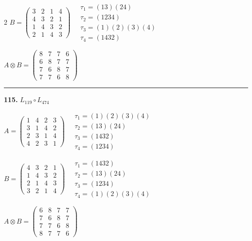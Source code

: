 \begin{multicols}{2}
$B = \begin{pmatrix} 3 & 2 & 1 & 4 \\ 4 & 3 & 2 & 1 \\ 1 & 4 & 3 & 2 \\ 2 & 1 & 4 & 3 \end{pmatrix} \quad \begin{matrix} \tau_{1}=(1 3)(2 4) \\ \tau_{2}=(1 2 3 4) \\ \tau_{3}=(1)(2)(3)(4) \\ \tau_{4}=(1 4 3 2) \end{matrix}$

$A \otimes B = \begin{pmatrix} 8 & 7 & 7 & 6 \\ 6 & 8 & 7 & 7 \\ 7 & 6 & 8 & 7 \\ 7 & 7 & 6 & 8 \end{pmatrix}$

\vspace{0.3em}
\hrule
\vspace{0.3em}

\noindent\textbf{115.} $L_{119} \circ L_{474}$

$A = \begin{pmatrix} 1 & 4 & 2 & 3 \\ 3 & 1 & 4 & 2 \\ 2 & 3 & 1 & 4 \\ 4 & 2 & 3 & 1 \end{pmatrix} \quad \begin{matrix} \tau_{1}=(1)(2)(3)(4) \\ \tau_{2}=(1 3)(2 4) \\ \tau_{3}=(1 4 3 2) \\ \tau_{4}=(1 2 3 4) \end{matrix}$

$B = \begin{pmatrix} 4 & 3 & 2 & 1 \\ 1 & 4 & 3 & 2 \\ 2 & 1 & 4 & 3 \\ 3 & 2 & 1 & 4 \end{pmatrix} \quad \begin{matrix} \tau_{1}=(1 4 3 2) \\ \tau_{2}=(1 3)(2 4) \\ \tau_{3}=(1 2 3 4) \\ \tau_{4}=(1)(2)(3)(4) \end{matrix}$

$A \otimes B = \begin{pmatrix} 6 & 8 & 7 & 7 \\ 7 & 6 & 8 & 7 \\ 7 & 7 & 6 & 8 \\ 8 & 7 & 7 & 6 \end{pmatrix}$


\end{multicols}
